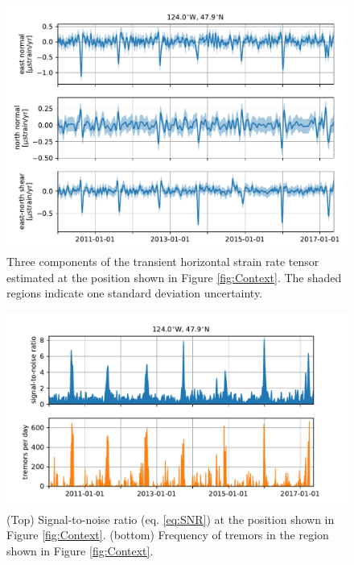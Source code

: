 \documentclass[10pt,letter]{article}
\begin{document}
\begin{figure}
\includegraphics{figures/strain_ts/strain-ts.pdf}
\caption{Three components of the transient horizontal strain rate tensor estimated at the position shown in Figure \ref{fig:Context}. The shaded regions indicate one standard deviation uncertainty.}   
\label{fig:StrainTs}
\end{figure}

\begin{figure}
\includegraphics{figures/strain_ts/mag-ts.pdf}
\caption{(Top) Signal-to-noise ratio (eq. \ref{eq:SNR}) at the position shown in Figure \ref{fig:Context}. (bottom) Frequency of tremors in the region shown in Figure \ref{fig:Context}.}   
\label{fig:StrainMag}
\end{figure}
\end{document}
